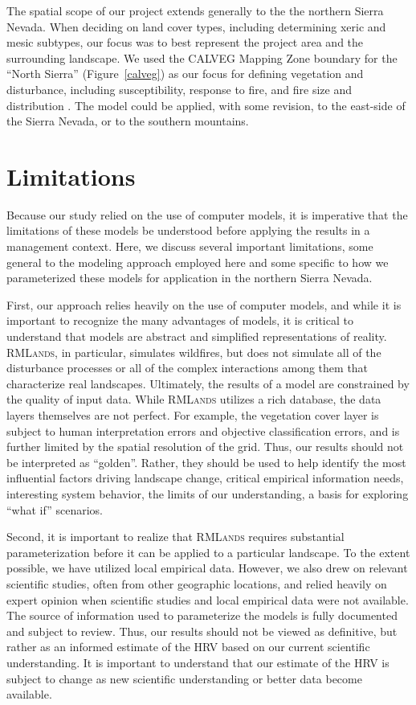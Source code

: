 The spatial scope of our project extends generally to the the northern Sierra Nevada. When deciding on land cover types, including determining xeric and mesic subtypes, our focus was to best represent the project area and the surrounding landscape. We used the CALVEG Mapping Zone boundary for the ``North Sierra'' (Figure~\ref{calveg}) as our focus for defining vegetation and disturbance, including susceptibility, response to fire, and fire size and distribution . The model could be applied, with some revision, to the east-side of the Sierra Nevada, or to the southern mountains.

\section{Limitations}

Because our study relied on the use of computer models, it is imperative that the limitations of these models be understood before applying the results in a management context. Here, we discuss several important limitations, some general to the modeling approach employed here and some specific to how we parameterized these models for application in the northern Sierra Nevada.

First, our approach relies heavily on the use of computer models, and while it is important to recognize the many advantages of models, it is critical to understand that models are abstract and simplified representations of reality. \textsc{RMLands}, in particular, simulates wildfires, but does not simulate all of the disturbance processes or all of the complex interactions among them that characterize real landscapes. Ultimately, the results of a model are constrained by the quality of input data. While \textsc{RMLands} utilizes a rich database, the data layers themselves are not perfect. For example, the vegetation cover layer is subject to human interpretation errors and objective classification errors, and is further limited by the spatial resolution of the grid. Thus, our results should not be interpreted as ``golden''. Rather, they should be used to help identify the most influential factors driving landscape change, critical empirical information needs, interesting system behavior, the limits of our understanding, a basis for exploring “what if” scenarios.

Second, it is important to realize that \textsc{RMLands} requires substantial parameterization before it can be applied to a particular landscape. To the extent possible, we have utilized local empirical data. However, we also drew on relevant scientific studies, often from other geographic locations, and relied heavily on expert opinion when scientific studies and local empirical data were not available. The source of information used to parameterize the models is fully documented and subject to review. Thus, our results should not be viewed as definitive, but rather as an informed estimate of the HRV based on our current scientific understanding. It is important to understand that our estimate of the HRV is subject to change as new scientific understanding or better data become available.

